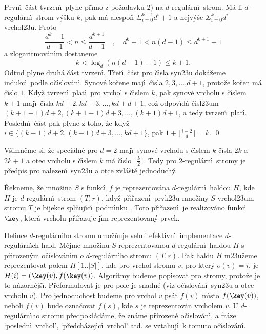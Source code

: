 \documentclass[a4paper,12pt]{article}
\begin{document}
Prvn\'\i\ \v c\'ast tvrzen\'\i\ plyne p\v r\'\i mo z po\v zadavku 2) na 
$d$-regul\'arn\'\i\ strom. M\'a-li $d$-regul\'arn\'\i\ strom v\'y\v sku $
k$, 
pak m\'a alespo\v n $\Sigma_{i=0}^{k-1}d^i+1$ a nejv\'y\v se $\Sigma_{
i=0}^kd^i$ 
vrchol\accent23u. Proto
$$\frac {d^k-1}{d-1}<n\le\frac {d^{k+1}}{d-1}\quad ,\quad d^k-1<n
(d-1)\le d^{k+1}-1$$
a zlogaritmov\'an\'\i m dostaneme
$$k<\log_d(n(d-1)+1)\le k+1.$$
Odtud plyne 
druh\'a \v c\'ast tvrzen\'\i .  T\v ret\'\i\ \v c\'ast pro \v c\'\i sla syn\accent23u dok\'a\v zeme 
indukc\'\i\ podle o\v c\'\i slov\'a\-n\'\i .  Synov\'e ko\v rene maj\'\i\ \v c\'\i sla 
$2,3,\dots$,$d+1$,  proto\v ze ko\v ren m\'a \v c\'\i slo $1$.  Kdy\v z tvrzen\'\i\ plat\'\i\ 
pro vrchol s \v c\'\i slem $k$, pak synov\'e vrcholu s \v c\'\i slem $
k+1$ 
maj\'\i\ \v c\'\i sla $kd+2,kd+3,\dots,kd+d+1$, co\v z odpov\'\i d\'a 
\v c\'\i sl\accent23um $(k+1-1)d+2,(k+1-1)d+3,\dots,(k+1)d+1$, a tedy 
tvrzen\'\i\ plat\'\i . Posledn\'\i\ \v c\'ast pak plyne z toho, \v ze kdy\v z $
i\in \{(k-1)d+2,(k-1)d+3,\dots,kd+1\}$, pak 
$1+\lfloor\frac {i-2}d\rfloor =k$. \qed
\enddemo

\flushpar V\v simn\v eme si, \v ze speci\'aln\v e pro $d=2$ maj\'\i\ synov\'e vrcholu s \v c\'\i slem $
k$ 
\v c\'\i sla $2k$ a $2k+1$ a otec vrcholu s \v c\'\i slem $k$ m\'a \v c\'\i slo 
$\lfloor\frac k2\rfloor$. Tedy pro $2$-regul\'arn\'\i\ stromy je p\v redpis pro nalezen\'\i\ 
syn\accent23u a otce zvl\'a\v st\v e jednoduch\'y.  
\medskip

\flushpar\v Rekneme, \v ze mno\v zina $S$ s funkc\'\i\ $f$ je reprezentov\'ana 
$d$-regul\'ar\-n\'\i\ haldou $H$, kde $H$ je $d$-regul\'arn\'\i\ strom $
(T,r)$, kdy\v z 
p\v ri\v razen\'\i\ prvk\accent23u mno\v ziny $S$ vrchol\accent23um stromu 
$T$ je bijekce spl\v nuj\'\i c\'\i\ podm\'\i nku . Toto p\v ri\v razen\'\i\ 
je realizov\'ano funkc\'\i\ $\key$, kter\'a vrcholu p\v ri\v razuje j\'\i m 
reprezentovan\'y prvek.
\medskip

\flushpar Defince $d$-regul\'arn\'\i ho stromu umo\v z\v nuje velmi efektivn\'\i\ 
implementace $d$-regul\'arn\'\i ch hald.  M\v ej\-me mno\v zinu $
S$ 
reprezentovanou $d$-regul\'arn\'\i\ haldou $H$ s p\v rirozen\'ym 
o\v c\'\i s\-lo\-v\'a\-n\'\i m $o$ $d$-regul\'arn\'\i\-ho stromu $
(T,r)$.  Pak haldu $H$ 
m\accent23u\v zeme reprezentovat polem $H[1..|S|]$, kde pro vrchol 
stromu $v$, pro kter\'y $o(v)=i$, je $H(i)=(\key(v),f(\key(v))$.  Algoritmy 
budeme popisovat pro stromy, proto\v ze je to n\'azorn\v ej\v s\'\i .  
P\v reformulovat je pro pole je snadn\'e (viz 
o\v c\'\i slov\'an\'\i\ syn\accent23u a otce vrcholu $v$).  Pro jednoduchost 
budeme pro vrchol $v$ ps\'at $f(v)$ m\'\i sto $f(\key(v))$, neboli $
f(v)$ 
bude ozna\v covat $f(s)$, kde $s$ je reprezentov\'an vrcholem $v$.  U 
$d$-regul\'arn\'\i ho stromu p\v redpo\-kl\'a\-d\'ame, \v ze zn\'ame p\v rirozen\'e 
o\v c\'\i slov\'an\'\i , a fr\'aze `posledn\'\i\ vrchol', `p\v red\-ch\'azej\'\i c\'\i\ vrchol' atd.  
se vztahuj\'\i\ k tomuto o\v c\'\i slov\'an\'\i .  
\bigskip
\end{document}

